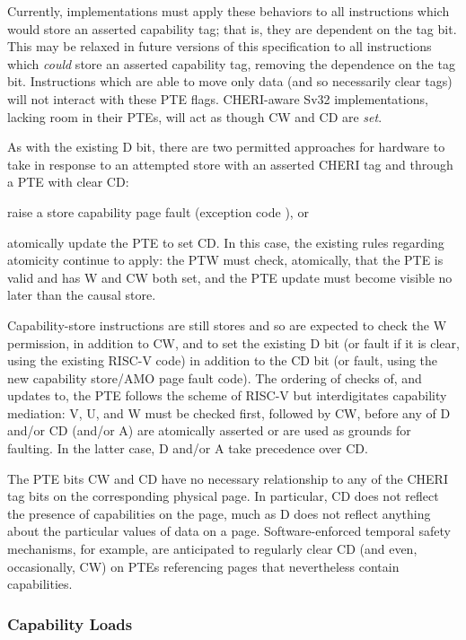 \noindent Currently, implementations must apply these behaviors to all
instructions which would store an asserted capability tag; that is, they are
dependent on the tag bit. This may be relaxed in future versions of this
specification to all instructions which \emph{could} store an asserted
capability tag, removing the dependence on the tag bit. Instructions which are
able to move only data (and so necessarily clear tags) will not interact with
these PTE flags. CHERI-aware Sv32 implementations, lacking room in their PTEs,
will act as though CW and CD are \emph{set}.

As with the existing D bit, there are two permitted approaches for hardware to
take in response to an attempted store with an asserted CHERI tag and through a
PTE with clear CD:
%
\begin{inenum}
%
  \item raise a store capability page fault (exception code
  \riscvstorecappagefault{}), or
%
  \item atomically update the PTE to set CD.  In this case, the existing rules
  regarding atomicity continue to apply: the PTW must check, atomically, that
  the PTE is valid and has W and CW both set, and the PTE update must become
  visible no later than the causal store.
%
\end{inenum}
%
Capability-store instructions are still stores and so are expected to check the
W permission, in addition to CW, and to set the existing D bit (or fault if it
is clear, using the existing RISC-V \xcause{} code) in addition to the CD bit
(or fault, using the new capability store/AMO page fault \xcause{} code).
%
The ordering of checks of, and updates to, the PTE follows the scheme of RISC-V
but interdigitates capability mediation: V, U, and W must be checked first,
followed by CW, before any of D and/or CD (and/or A) are atomically asserted or
are used as grounds for faulting.  In the latter case, D and/or A take
precedence over CD.

The PTE bits CW and CD have no necessary relationship to any of the CHERI tag
bits on the corresponding physical page.  In particular, CD does not reflect
the presence of capabilities on the page, much as D does not reflect anything
about the particular values of data on a page.  Software-enforced temporal
safety mechanisms, for example, are anticipated to regularly clear CD (and
even, occasionally, CW) on PTEs referencing pages that nevertheless contain
capabilities.

\subsubsection{Capability Loads}

